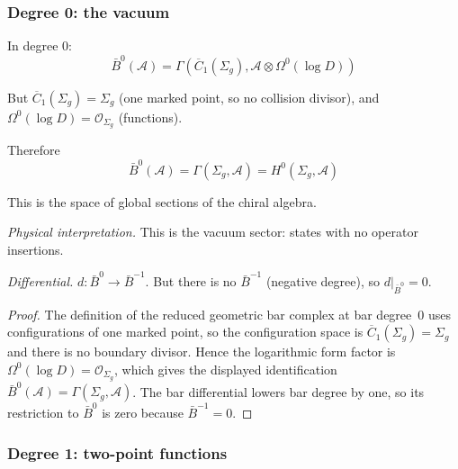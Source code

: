\subsubsection{Degree 0: the vacuum}

\begin{computation}\label{comp:deg0}
In degree 0:
\[\bar{B}^0(\mathcal{A}) = \Gamma\left(\overline{C}_1(\Sigma_g), \mathcal{A} \otimes \Omega^0(\log D)\right)\]

But $\overline{C}_1(\Sigma_g) = \Sigma_g$ (one marked point, so no collision divisor), and $\Omega^0(\log D) = \mathcal{O}_{\Sigma_g}$ (functions).

Therefore
\[\bar{B}^0(\mathcal{A}) = \Gamma(\Sigma_g, \mathcal{A}) = H^0(\Sigma_g, \mathcal{A})\]

This is the space of global sections of the chiral algebra.

\emph{Physical interpretation.} This is the vacuum sector: states with no operator insertions.

\emph{Differential.} $d: \bar{B}^0 \to \bar{B}^{-1}$. But there is no $\bar{B}^{-1}$ (negative degree), so $d|_{\bar{B}^0} = 0$.
\end{computation}

\begin{proof}
The definition of the reduced geometric bar complex at bar degree~$0$
uses configurations of one marked point, so the configuration space is
\(\overline{C}_1(\Sigma_g)=\Sigma_g\) and there is no boundary divisor.
Hence the logarithmic form factor is \(\Omega^0(\log D)=\mathcal{O}_{\Sigma_g}\),
which gives the displayed identification
\(\bar B^0(\mathcal A)=\Gamma(\Sigma_g,\mathcal A)\).
The bar differential lowers bar degree by one, so its restriction to
\(\bar B^0\) is zero because \(\bar B^{-1}=0\).
\end{proof}

\subsubsection{Degree 1: two-point functions}

